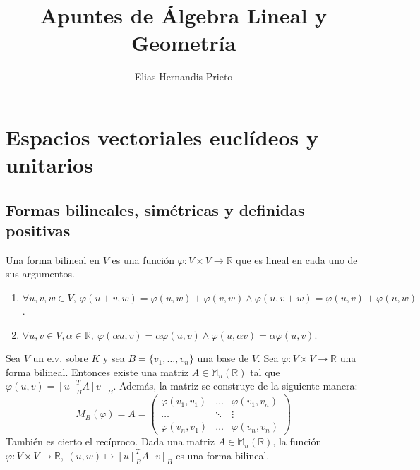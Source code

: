 \documentclass[14pt]{book}
\begin{document}
	\title{Apuntes de Álgebra Lineal y Geometría}
	\author{Elias Hernandis Prieto}
	\maketitle

\chapter{Espacios vectoriales eucl\'{i}deos y unitarios}

\section{Formas bilineales, simétricas y definidas positivas}

\begin{dfn}
	Una forma bilineal en $V$ es una función $\varphi:V \times V \to \mathbb{R}$ que es lineal en cada uno de sus argumentos.
	\begin{enumerate}
		\item $\forall u, v, w \in V,\ \varphi(u + v, w) = \varphi(u, w) + \varphi(v, w) \land \varphi(u, v + w) = \varphi(u, v) + \varphi(u, w)$.
		\item $\forall u, v \in V, \alpha \in \mathbb{R},\ \varphi(\alpha u, v) = \alpha\varphi(u, v) \land \varphi(u, \alpha v) = \alpha \varphi(u, v)$.
	\end{enumerate}
\end{dfn}

\begin{tm}
	Sea $V$ un e.v. sobre $K$ y sea $B=\{v_1, \dots, v_n\}$ una base de $V$. Sea $\varphi: V\times V \to \mathbb{R}$ una forma bilineal. Entonces existe una matriz $A \in \mathbb{M}_n (\mathbb{R})$ tal que $\varphi(u, v) = [u]_B^T A [v]_B$. Además, la matriz se construye de la siguiente manera:
	\[
		M_B(\mathbb{\varphi}) = A = \left(\begin{array}{ccc}
		\varphi(v_1, v_1) & \dots & \varphi(v_1, v_n)\\
		\dots & \ddots & \vdots \\
		\varphi(v_n, v_1) & \dots & \varphi(v_n, v_n)
		\end{array}\right)
	\]
	También es cierto el recíproco. Dada una matriz $A \in \mathbb{M}_n(\mathbb{R})$, la función $\varphi : V \times V \to \mathbb{R},\ (u, w) \mapsto [u]_B^T A [v]_B$ es una forma bilineal.
\end{tm}
\end{document}
